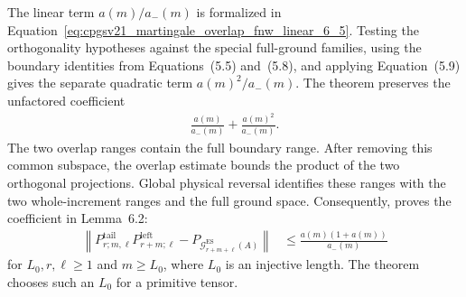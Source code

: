 \documentclass{article}
\begin{document}
The linear term $a(m)/a_-(m)$ is formalized in
Equation~\eqref{eq:cpgsv21_martingale_overlap_fnw_linear_6_5}. Testing the
orthogonality hypotheses against the special full-ground families, using the
boundary identities from Equations~(5.5) and~(5.8), and applying
Equation~(5.9) gives the separate quadratic term $a(m)^2/a_-(m)$. The theorem
 preserves the
unfactored coefficient
\begin{align}
    \frac{a(m)}{a_-(m)}+\frac{a(m)^2}{a_-(m)}.
    \label{eq:cpgsv21_martingale_overlap_fnw_unfactored_sum}
\end{align}
The two overlap ranges contain the full boundary range. After removing this
common subspace, the overlap estimate bounds the product of the two orthogonal
projections. Global physical reversal identifies these ranges with the two
whole-increment ranges and the full ground space. Consequently,
proves the coefficient in Lemma~6.2:
\begin{align}
    \left\lVert
    P^{\mathrm{tail}}_{r;m,\ell}P^{\mathrm{left}}_{r+m;\ell}
    -P_{\mathcal G_{r+m+\ell}^{\mathrm{ES}}(A)}
    \right\rVert
     & \leq\frac{a(m)(1+a(m))}{a_-(m)}
    \label{eq:cpgsv21_martingale_overlap_fnw_projector_defect}
\end{align}
for $L_0,r,\ell\geq1$ and $m\geq L_0$, where $L_0$ is an injective length.
The theorem
chooses such an $L_0$ for a primitive tensor.
\end{document}
